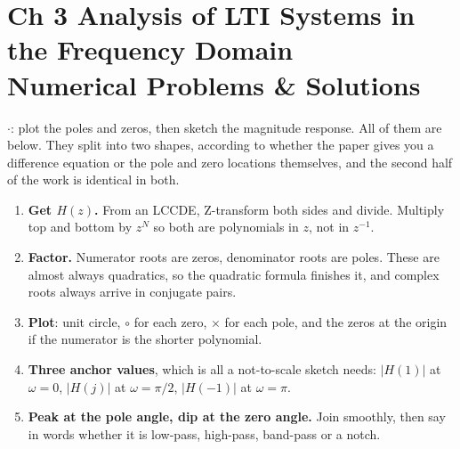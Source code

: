 \section*{\color{acc}Ch 3 \textperiodcentered{} Analysis of LTI Systems in the Frequency
Domain\\[2pt]
{\large\textcolor{sub}{Numerical Problems \& Solutions}}}
\vspace{-4pt}{\color{acc}\rule{\textwidth}{1.1pt}}\vspace{4pt}

{\color{sub}\footnotesize {} \gap$\cdot$\gap {}: plot the poles and zeros, then sketch the magnitude response. All of them are
below. They split into two shapes, according to whether the paper gives you a difference
equation or the pole and zero locations themselves, and the second half of the work is
identical in both.}

\begin{enumerate}
  \item \textbf{Get $H(z)$.} From an LCCDE, Z-transform both sides and divide. Multiply
        top and bottom by $z^{N}$ so both are polynomials in $z$, not in $z^{-1}$.
  \item \textbf{Factor.} Numerator roots are zeros, denominator roots are poles. These
        are almost always quadratics, so the quadratic formula finishes it, and complex
        roots always arrive in conjugate pairs.
  \item \textbf{Plot}: unit circle, $\circ$ for each zero, $\times$ for each pole, and
        the zeros at the origin if the numerator is the shorter polynomial.
  \item \textbf{Three anchor values}, which is all a not-to-scale sketch needs:
        $|H(1)|$ at $\omega=0$, $|H(j)|$ at $\omega=\pi/2$, $|H(-1)|$ at $\omega=\pi$.
  \item \textbf{Peak at the pole angle, dip at the zero angle.} Join smoothly, then say
        in words whether it is low-pass, high-pass, band-pass or a notch.
\end{enumerate}

